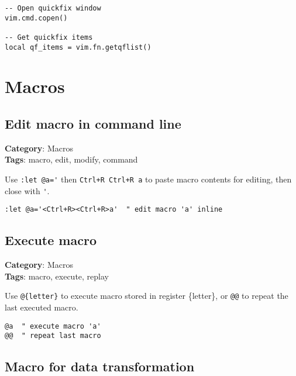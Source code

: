 {{{{{{{\begin{Exa*}{}
\begin{Verbatim}[fontsize=\footnotesize, breaklines, breakanywhere]
-- Open quickfix window
vim.cmd.copen()

-- Get quickfix items
local qf_items = vim.fn.getqflist()
\end{Verbatim}
\end{Exa*}

\chapter{Macros}
\section{Edit macro in command line}

\textbf{Category}: Macros\\ \textbf{Tags}: macro, edit, modify, command
\vspace{0.5cm}

Use {\footnotesize \Verb§:let @a='§} then {\footnotesize \Verb§Ctrl+R Ctrl+R a§} to paste macro contents for editing, then close with {\footnotesize \Verb§'§}.

\begin{Exa*}{}
\begin{Verbatim}[fontsize=\footnotesize, breaklines, breakanywhere]
:let @a='<Ctrl+R><Ctrl+R>a'  " edit macro 'a' inline
\end{Verbatim}
\end{Exa*}

\section{Execute macro}

\textbf{Category}: Macros\\ \textbf{Tags}: macro, execute, replay
\vspace{0.5cm}

Use {\footnotesize \Verb§@{letter}§} to execute macro stored in register \{letter\}, or {\footnotesize \Verb§@@§} to repeat the last executed macro.

\begin{Exa*}{}
\begin{Verbatim}[fontsize=\footnotesize, breaklines, breakanywhere]
@a  " execute macro 'a'
@@  " repeat last macro
\end{Verbatim}
\end{Exa*}

\section{Macro for data transformation}

}}}}}}}
